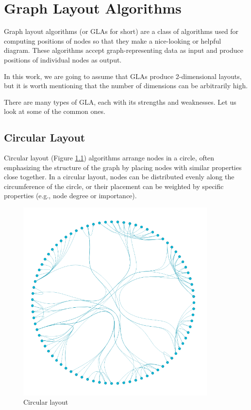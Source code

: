\chapter{Graph Layout Algorithms}
\label{chap:graph_layout_algorithms}

Graph layout algorithms (or \glspl{GLA} for short) are a class of algorithms used for computing positions
of nodes so that they make a nice-looking or helpful diagram.
These algorithms accept graph-representing data as input and produce positions of individual nodes as output.

In this work, we are going to assume that GLAs produce 2-dimensional layouts,
but it is worth mentioning that the number of dimensions can be arbitrarily high.

There are many types of GLA, each with its strengths and weaknesses.
Let us look at some of the common ones.

\section{Circular Layout}

Circular layout (Figure \ref{obr:graph_layout_circular}) algorithms arrange nodes in a circle, often emphasizing the structure of the graph by placing nodes
with similar properties close together.
In a circular layout, nodes can be distributed evenly along the circumference of the circle,
or their placement can be weighted by specific properties (e.g., node degree or importance).

\begin{figure}[h]\centering
    \includegraphics[width=100mm, keepaspectratio]{img/graph_layout_cicrular.png}
    \caption{Circular layout\cite{graph_layout_demos}}
    \label{obr:graph_layout_circular}
\end{figure}

